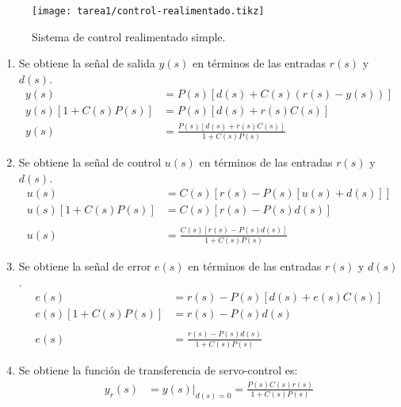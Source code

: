   \begin{ejercicio}
    \begin{figure}[H]
        \centering
        \texttt{[image: tarea1/control-realimentado.tikz]}
        \caption{Sistema de control realimentado simple.}
        \label{img:ejercicio1}
    \end{figure}
  \end{ejercicio}
  \begin{enumerate}
    \item 
    Se obtiene la señal de salida $y(s)$ en términos de las entradas $r(s)$ y $d(s)$.
    \begin{align*}
      y(s) &= P(s) \left[ d(s) + C(s) \left( r(s) - y(s) \right) \right]
      \\
      y(s) \left[ 1 + C(s) P(s) \right] &= P(s) \left[ d(s) + r(s) C(s) \right]
      \\
      y(s) &= \frac{P(s) \left[ d(s) + r(s) C(s) \right]}{1 + C(s) P(s)}
    \end{align*}

    \item
    Se obtiene la señal de control $u(s)$ en términos de las entradas $r(s)$ y $d(s)$.
    \begin{align*}
      u(s) &= C(s) \left[ r(s) - P(s) \left[ u(s) + d(s) \right] \right]
      \\
      u(s) \left[ 1 + C(s) P(s) \right] &= C(s) \left[ r(s) - P(s) d(s) \right]
      \\ \\
      u(s) &= \frac{C(s) \left[ r(s) - P(s) d(s) \right]}{1 + C(s) P(s)}
    \end{align*}

    \item
    Se obtiene la señal de error $e(s)$ en términos de las entradas $r(s)$ y $d(s)$.
    \begin{align*}
      e(s) &= r(s) - P(s) \left[ d(s) + e(s) C(s) \right]
      \\
      e(s) \left[ 1 + C(s) P(s) \right] &= r(s) - P(s) d(s)
      \\ \\
      e(s) &= \frac{r(s) - P(s) d(s)}{1 + C(s) P(s)}
    \end{align*}

    \item
    Se obtiene la función de transferencia de servo-control es:
    \begin{align*}
      y_{r}(s) &= y(s)|_{d(s)=0} = \frac{P(s) C(s) r(s)}{1 + C(s) P(s)}
    \end{align*}


\end{enumerate}
